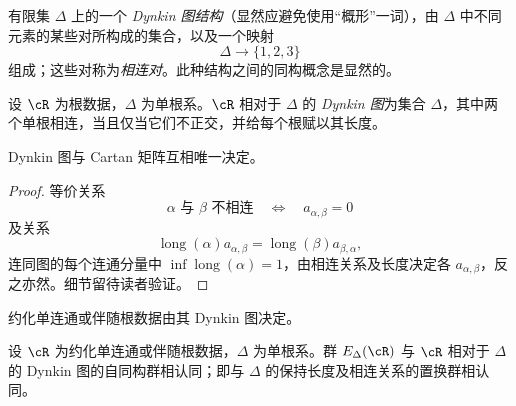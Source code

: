 \begin{definition}\label{sga3:XXI:7.4.1}
有限集 \(\Delta\) 上的一个 \emph{Dynkin 图结构}（显然应避免使用“概形”一词），由 \(\Delta\) 中不同元素的某些对所构成的集合，以及一个映射
\[
 \Delta\longrightarrow\{1,2,3\}
\]
组成；这些对称为\emph{相连对}。此种结构之间的同构概念是显然的。
\end{definition}

\begin{definition}\label{sga3:XXI:7.4.2}
设 \(\cR\) 为根数据，\(\Delta\) 为单根系。\(\cR\) 相对于 \(\Delta\) 的 \emph{Dynkin 图}为集合 \(\Delta\)，其中两个单根相连，当且仅当它们不正交，并给每个根赋以其长度。
\end{definition}

\begin{proposition}\label{sga3:XXI:7.4.3}
Dynkin 图与 Cartan 矩阵互相唯一决定。
\end{proposition}

\begin{proof}
等价关系
\[
 \alpha\text{ 与 }\beta\text{ 不相连}
 \quad\Longleftrightarrow\quad
 a_{\alpha,\beta}=0
\]
及关系
\[
 \operatorname{long}(\alpha)a_{\alpha,\beta}
 =
 \operatorname{long}(\beta)a_{\beta,\alpha},
\]
连同图的每个连通分量中 \(\inf\operatorname{long}(\alpha)=1\)，由相连关系及长度决定各 \(a_{\alpha,\beta}\)，反之亦然。细节留待读者验证。
\end{proof}

\begin{corollary}\label{sga3:XXI:7.4.4}
约化单连通或伴随根数据由其 Dynkin 图决定。
\end{corollary}

\begin{corollary}\label{sga3:XXI:7.4.5}
设 \(\cR\) 为约化单连通或伴随根数据，\(\Delta\) 为单根系。群 \(E_\Delta(\cR)\) 与 \(\cR\) 相对于 \(\Delta\) 的 Dynkin 图的自同构群相认同；即与 \(\Delta\) 的保持长度及相连关系的置换群相认同。
\end{corollary}

